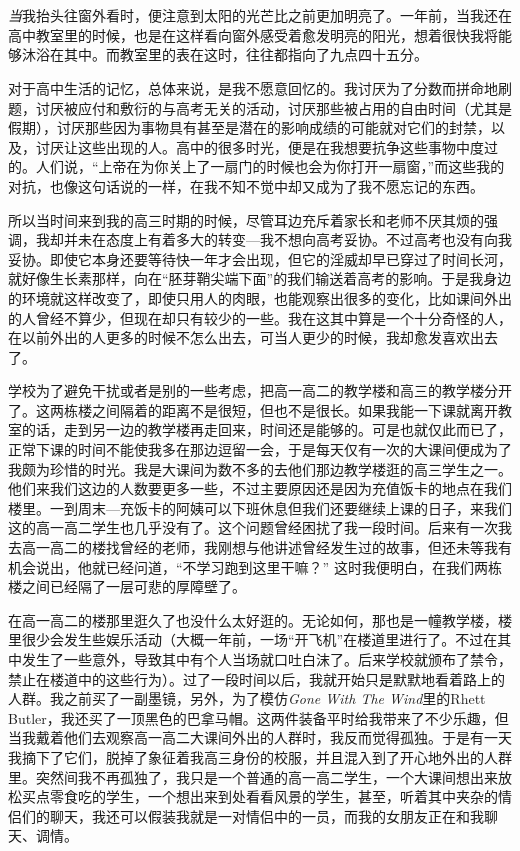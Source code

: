 \documentclass[UTF8,oneside]{ctexbook}
\begin{document}
\chapter{}
{\Large \emph{当}}我抬头往窗外看时，便注意到太阳的光芒比之前更加明亮了。一年前，当我还在高中教室里的时候，也是在这样看向窗外感受着愈发明亮的阳光，想着很快我将能够沐浴在其中。而教室里的表在这时，往往都指向了九点四十五分。

对于高中生活的记忆，总体来说，是我不愿意回忆的。我讨厌为了分数而拼命地刷题，讨厌被应付和敷衍的与高考无关的活动，讨厌那些被占用的自由时间（尤其是假期），讨厌那些因为事物具有甚至是潜在的影响成绩的可能就对它们的封禁，以及，讨厌让这些出现的人。高中的很多时光，便是在我想要抗争这些事物中度过的。人们说，``上帝在为你关上了一扇门的时候也会为你打开一扇窗，''而这些我的对抗，也像这句话说的一样，在我不知不觉中却又成为了我不愿忘记的东西。

所以当时间来到我的高三时期的时候，尽管耳边充斥着家长和老师不厌其烦的强调，我却并未在态度上有着多大的转变---我不想向高考妥协。不过高考也没有向我妥协。即使它本身还要等待快一年才会出现，但它的淫威却早已穿过了时间长河，就好像生长素那样，向在``胚芽鞘尖端下面''的我们输送着高考的影响。于是我身边的环境就这样改变了，即使只用人的肉眼，也能观察出很多的变化，比如课间外出的人曾经不算少，但现在却只有较少的一些。我在这其中算是一个十分奇怪的人，在以前外出的人更多的时候不怎么出去，可当人更少的时候，我却愈发喜欢出去了。

学校为了避免干扰或者是别的一些考虑，把高一高二的教学楼和高三的教学楼分开了。这两栋楼之间隔着的距离不是很短，但也不是很长。如果我能一下课就离开教室的话，走到另一边的教学楼再走回来，时间还是能够的。可是也就仅此而已了，正常下课的时间不能使我多在那边逗留一会，于是每天仅有一次的大课间便成为了我颇为珍惜的时光。我是大课间为数不多的去他们那边教学楼逛的高三学生之一。他们来我们这边的人数要更多一些，不过主要原因还是因为充值饭卡的地点在我们楼里。一到周末---充饭卡的阿姨可以下班休息但我们还要继续上课的日子，来我们这的高一高二学生也几乎没有了。这个问题曾经困扰了我一段时间。后来有一次我去高一高二的楼找曾经的老师，我刚想与他讲述曾经发生过的故事，但还未等我有机会说出，他就已经问道，``不学习跑到这里干嘛？'' 这时我便明白，在我们两栋楼之间已经隔了一层可悲的厚障壁了。

在高一高二的楼那里逛久了也没什么太好逛的。无论如何，那也是一幢教学楼，楼里很少会发生些娱乐活动（大概一年前，一场``开飞机''在楼道里进行了。不过在其中发生了一些意外，导致其中有个人当场就口吐白沫了。后来学校就颁布了禁令，禁止在楼道中的这些行为）。过了一段时间以后，我就开始只是默默地看着路上的人群。我之前买了一副墨镜，另外，为了模仿\emph{Gone With The Wind}里的Rhett Butler，我还买了一顶黑色的巴拿马帽。这两件装备平时给我带来了不少乐趣，但当我戴着他们去观察高一高二大课间外出的人群时，我反而觉得孤独。于是有一天我摘下了它们，脱掉了象征着我高三身份的校服，并且混入到了开心地外出的人群里。突然间我不再孤独了，我只是一个普通的高一高二学生，一个大课间想出来放松买点零食吃的学生，一个想出来到处看看风景的学生，甚至，听着其中夹杂的情侣们的聊天，我还可以假装我就是一对情侣中的一员，而我的女朋友正在和我聊天、调情。
\end{document}
